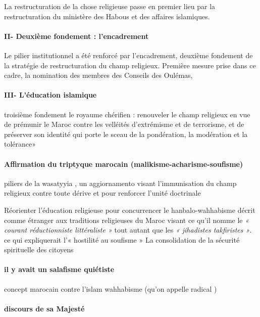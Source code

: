   La restructuration de la chose religieuse passe en premier lieu par la restructuration du ministère des Habous et des affaires islamiques.
  \paragraph{II- Deuxième fondement : l'encadrement}
   Le pilier institutionnel a été renforcé par l'encadrement, deuxième fondement de la stratégie de restructuration du champ religieux. Première mesure prise dans ce cadre, la nomination des membres des Conseils des Oulémas,
     \paragraph{III-
L'éducation islamique}
   troisième
fondement
 le royaume chérifien : renouveler le champ religieux en vue de prémunir le Maroc contre les velléités d'extrémisme et de terrorisme, et de préserver son identité qui porte le sceau de la pondération, la modération et la tolérance»

 \paragraph{Affirmation du triptyque marocain (malikisme-acharisme-soufisme)}
 piliers de la wasatyyia , un aggiornamento visant l'immunisation du champ religieux contre toute dérive et pour renforcer l'unité doctrinale

Réorienter l'éducation religieuse pour concurrencer le hanbalo-wahhabisme décrit comme étranger aux traditions religieuses du Maroc   visant ce qu'il nomme le \textit{« courant réductionniste littéraliste »} tout autant que les \textit{« jihadistes takfiristes »}. ce qui expliquerait l'« hostilité au soufisme » La consolidation de la sécurité spirituelle des citoyens



\paragraph{il y avait un salafisme quiétiste} 

\begin{Def}
    concept marocain contre l'islam wahhabisme (qu'on appelle radical )
\end{Def}

\paragraph{discours de sa Majesté}



